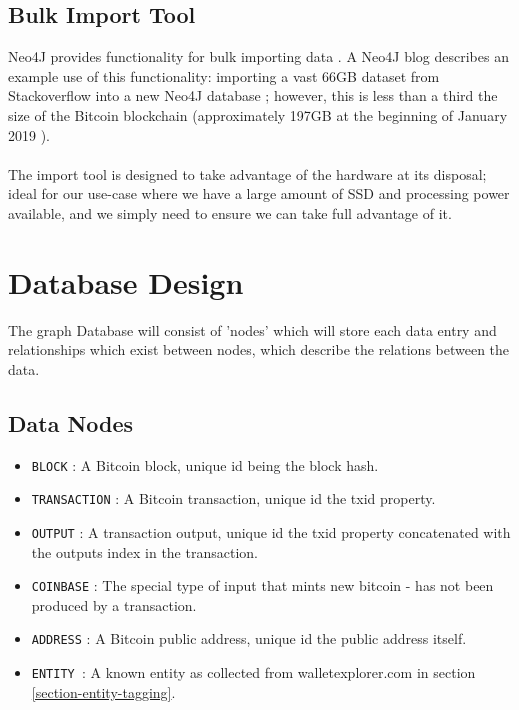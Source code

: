 \subsection{Bulk Import Tool}
Neo4J provides functionality for bulk importing data \cite{RefWorks:doc:5c6ab610e4b02c4a19ae3ed1}. A Neo4J blog describes an example use of this functionality: importing a  vast 66GB dataset from Stackoverflow into a new Neo4J database \cite{RefWorks:doc:5c6ab2bae4b08c9b85da964f}; however, this is less than a third the size of the Bitcoin blockchain (approximately 197GB at the beginning of January 2019 \cite{RefWorks:doc:5c6ab1a3e4b05e3aaec0ffc8}).
\\\\ 
The import tool is designed to take advantage of the hardware at its disposal; ideal for our use-case where we have a large amount of SSD and processing power available, and we simply need to ensure we can take full advantage of it. 

\section{Database Design}
The graph Database will consist of 'nodes' which will store each data entry and relationships which exist between nodes, which describe the relations between the data. 

\subsection{Data Nodes}
\begin{itemize}
    \item \texttt{BLOCK} : A Bitcoin block, unique id being the block hash. 
    \item \texttt{TRANSACTION} : A Bitcoin transaction, unique id the txid property.
    \item \texttt{OUTPUT} : A transaction output, unique id the txid property concatenated with the outputs index in the transaction.
    \item \texttt{COINBASE} : The special type of input that mints new bitcoin - has not been produced by a transaction. 
    \item \texttt{ADDRESS} : A Bitcoin public address, unique id the public address itself.
    \item \texttt{ENTITY }: A known entity as collected from walletexplorer.com in section \ref{section-entity-tagging}. 
\end{itemize}

